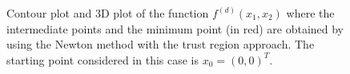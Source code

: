 \documentclass[a4paper,11pt]{article}
\begin{document}
		\begin{figure}[H]
		\centering
		 \quad
		\caption{Contour plot and 3D plot of the function $f^{(d)}(x_{1},x_{2})$ where the intermediate points and the minimum point (in red) are obtained by using the Newton method with the trust region approach. The starting point considered in this case is $x_{0}=(0,0)^{T}$.}
		\label{Fig:func_d}
	\end{figure}
	
\end{document}
